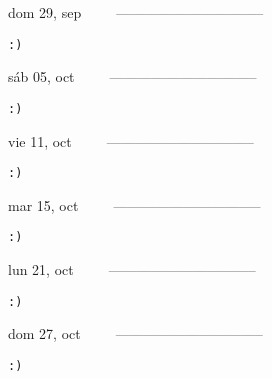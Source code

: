 \documentclass[letterpaper,10pt]{article}
\begin{document}
\begin{multicols}{3}
{dom 29, sep\ \ \ \ \ --------------------------------}
\begin{flushright}\begin{small}\texttt{:)}\end{small}\end{flushright}
\vfill
{sáb 05, oct\ \ \ \ \ --------------------------------}
\begin{flushright}\begin{small}\texttt{:)}\end{small}\end{flushright}\par
\vfill
{vie 11, oct\ \ \ \ \ --------------------------------}
\begin{flushright}\begin{small}\texttt{:)}\end{small}\end{flushright}\par
\vfill
\end{multicols}
\vspace{1.05cm}

\begin{multicols}{3}
{mar 15, oct\ \ \ \ \ --------------------------------}
\begin{flushright}\begin{small}\texttt{:)}\end{small}\end{flushright}
\vfill
{lun 21, oct\ \ \ \ \ --------------------------------}
\begin{flushright}\begin{small}\texttt{:)}\end{small}\end{flushright}\par
\vfill
{dom 27, oct\ \ \ \ \ --------------------------------}
\begin{flushright}\begin{small}\texttt{:)}\end{small}\end{flushright}\par
\vfill
\end{multicols}
\vspace{1.05cm}
\end{document}
